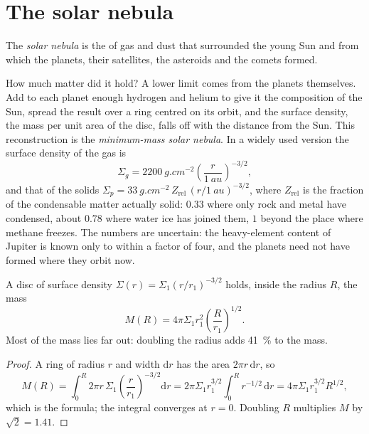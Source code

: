\section{The solar nebula}

\begin{definition}\label{def:b2:planet-formation-meteorites:nebula}
The \emph{solar nebula} is the  of gas
and dust that surrounded the young Sun and from which the planets, their
satellites, the asteroids and the comets formed.
\end{definition}

How much matter did it hold? A lower limit comes from the planets themselves.
Add to each planet enough hydrogen and helium to give it the composition of the
Sun, spread the result over a ring centred on its orbit, and the surface
density, the mass per unit area of the disc, falls off with the distance from
the Sun. This reconstruction is the \emph{minimum-mass solar
nebula}. In a widely used version the surface
density of the gas is
\[
  \Sigma_g = \qty{2200}{g.cm^{-2}}\left(\frac{r}{\qty{1}{au}}\right)^{-3/2},
\]
and that of the solids $\Sigma_p = \qty{33}{g.cm^{-2}}\,Z_{\mathrm{rel}}\,
(r/\qty{1}{au})^{-3/2}$, where $Z_{\mathrm{rel}}$ is the fraction of the
condensable matter actually solid: $0.33$ where only rock and metal have
condensed, about $0.78$ where water ice has joined them, $1$ beyond the place
where methane freezes. The numbers are uncertain: the heavy-element content of
Jupiter is known only to within a factor of four, and the planets need not have
formed where they orbit now.

\begin{proposition}\label{prop:b2:planet-formation-meteorites:disc-mass}
A disc of surface density $\Sigma(r) = \Sigma_1 (r/r_1)^{-3/2}$ holds, inside
the radius $R$, the mass
\[
  M(R) = 4\pi\Sigma_1 r_1^2 \left(\frac{R}{r_1}\right)^{1/2}.
\]
Most of the mass lies far out: doubling the radius adds \qty{41}{\percent} to
the mass.
\end{proposition}

\begin{proof}
A ring of radius $r$ and width $\mathrm dr$ has the area $2\pi r\,\mathrm dr$, so
\[
  M(R) = \int_0^R 2\pi r\,\Sigma_1 \left(\frac{r}{r_1}\right)^{-3/2}\mathrm dr
       = 2\pi\Sigma_1 r_1^{3/2}\int_0^R r^{-1/2}\,\mathrm dr
       = 4\pi\Sigma_1 r_1^{3/2} R^{1/2},
\]
which is the formula; the integral converges at $r = 0$. Doubling $R$
multiplies $M$ by $\sqrt 2 = 1.41$.
\end{proof}


